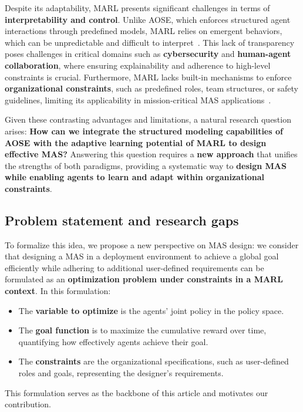 \documentclass[pdflatex,sn-mathphys-num]{sn-jnl}%
\theoremstyle{thmstyleone}%
\theoremstyle{thmstyletwo}%
\theoremstyle{thmstylethree}%
\begin{document}
Despite its adaptability, MARL presents significant challenges in terms of \textbf{interpretability and control}. Unlike AOSE, which enforces structured agent interactions through predefined models, MARL relies on emergent behaviors, which can be unpredictable and difficult to interpret~\cite{Du2022}. This lack of transparency poses challenges in critical domains such as \textbf{cybersecurity} and \textbf{human-agent collaboration}, where ensuring explainability and adherence to high-level constraints is crucial. Furthermore, MARL lacks built-in mechanisms to enforce \textbf{organizational constraints}, such as predefined roles, team structures, or safety guidelines, limiting its applicability in mission-critical MAS applications~\cite{Nguyen2020}.

Given these contrasting advantages and limitations, a natural research question arises: \textbf{How can we integrate the structured modeling capabilities of AOSE with the adaptive learning potential of MARL to design effective MAS?} Answering this question requires a \textbf{new approach} that unifies the strengths of both paradigms, providing a systematic way to \textbf{design MAS while enabling agents to learn and adapt within organizational constraints}.

\subsection{Problem statement and research gaps}

To formalize this idea, we propose a new perspective on MAS design: we consider that designing a MAS in a deployment environment to achieve a global goal efficiently while adhering to additional user-defined requirements can be formulated as an \textbf{optimization problem under constraints in a MARL context}. In this formulation:
\begin{itemize}
    \item The \textbf{variable to optimize} is the agents' joint policy in the policy space.
    \item The \textbf{goal function} is to maximize the cumulative reward over time, quantifying how effectively agents achieve their goal.
    \item The \textbf{constraints} are the organizational specifications, such as user-defined roles and goals, representing the designer's requirements.
\end{itemize}
This formulation serves as the backbone of this article and motivates our contribution. 
\end{document}
